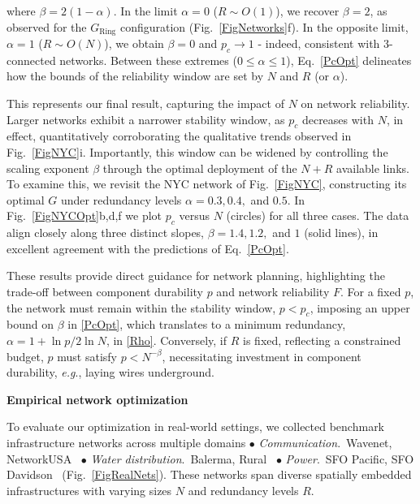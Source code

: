 \documentclass[oneside, a4paper, onecolumn, 11pt]{article}
\begin{document}
\begin{refsection}
where $\beta = 2(1 - \alpha)$. In the limit $\alpha = 0$ ($R \sim O(1)$), we recover $\beta = 2$, as observed for the $G_{\text{Ring}}$ configuration (Fig.~\ref{FigNetworks}f). In the opposite limit, $\alpha = 1$ ($R \sim O(N)$), we obtain $\beta = 0$ and $p_c \to 1$ - indeed, consistent with $3$-connected networks. Between these extremes ($0 \le \alpha \le 1$), Eq.~\eqref{PcOpt} delineates how the bounds of the reliability window are set by $N$ and $R$ (or $\alpha$).

This represents our final result, capturing the impact of $N$ on network reliability. Larger networks exhibit a narrower stability window, as $p_c$ decreases with $N$, in effect, quantitatively corroborating the qualitative trends observed in Fig.~\ref{FigNYC}i. Importantly, this window can be widened by controlling the scaling exponent $\beta$ through the optimal deployment of the $N + R$ available links. To examine this, we revisit the NYC network of Fig.~\ref{FigNYC}, constructing its optimal $G$ under redundancy levels $\alpha = 0.3, 0.4,$ and $0.5$. In Fig.~\ref{FigNYCOpt}b,d,f we plot $p_c$ versus $N$ (circles) for all three cases. The data align closely along three distinct slopes, $\beta = 1.4, 1.2,$ and $1$ (solid lines), in excellent agreement with the predictions of Eq.~\eqref{PcOpt}.

These results provide direct guidance for network planning, highlighting the trade-off between component durability $p$ and network reliability $F$. For a fixed $p$, the network must remain within the stability window, $p < p_c$, imposing an upper bound on $\beta$ in \eqref{PcOpt}, which translates to a minimum redundancy, $\alpha = 1 + \ln p / 2\ln N$, in \eqref{Rho}. Conversely, if $R$ is fixed, reflecting a constrained budget, $p$ must satisfy $p < N^{-\beta}$, necessitating investment in component durability, \textit{e.g}., laying wires underground.

\vspace{3mm}
\textbf{\color{blue} \Large Empirical network optimization}
 
To evaluate our optimization in real-world settings, we collected benchmark infrastructure networks across multiple domains $\bullet$ \textit{Communication}.\ Wavenet, NetworkUSA~\supercite{knight2011internet} $\bullet$ \textit{Water distribution}.\ Balerma, Rural~\supercite{wdsrd,marchi2014,bietal2015,reca2008,zheng2011,bietal2015} $\bullet$ \textit{Power}.\ SFO Pacific, SFO Davidson~\supercite{smartds,elliott2020smartds,smartds_readme} (Fig.~\ref{FigRealNets}). These networks span diverse spatially embedded infrastructures with varying sizes $N$ and redundancy levels $R$.


\end{refsection}
\end{document}
